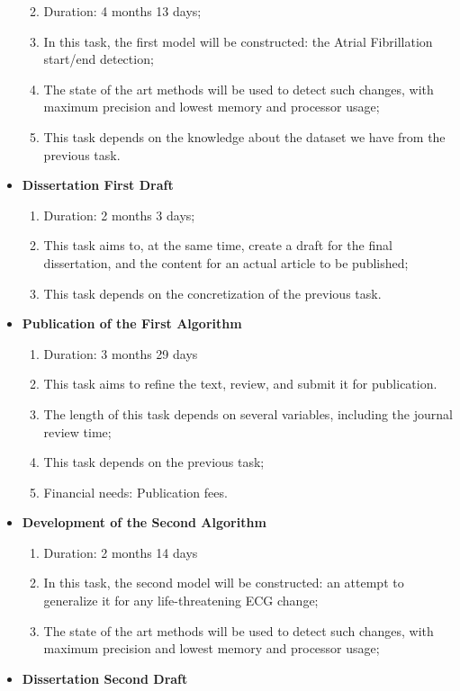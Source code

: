 \documentclass[runningheads]{llncs}
\providecommand{\tightlist}{%
  \setlength{\itemsep}{0pt}\setlength{\parskip}{0pt}}
\begin{document}
\begin{itemize}
  \begin{enumerate}
  \def\labelenumi{\arabic{enumi}.}
  \tightlist
  \item
    Duration: 4 months 13 days;
  \item
    In this task, the first model will be constructed: the Atrial
    Fibrillation start/end detection;
  \item
    The state of the art methods will be used to detect such changes,
    with maximum precision and lowest memory and processor usage;
  \item
    This task depends on the knowledge about the dataset we have from
    the previous task.
  \end{enumerate}
\item
  \textbf{Dissertation First Draft}

  \begin{enumerate}
  \def\labelenumi{\arabic{enumi}.}
  \tightlist
  \item
    Duration: 2 months 3 days;
  \item
    This task aims to, at the same time, create a draft for the final
    dissertation, and the content for an actual article to be published;
  \item
    This task depends on the concretization of the previous task.
  \end{enumerate}
\item
  \textbf{Publication of the First Algorithm}

  \begin{enumerate}
  \def\labelenumi{\arabic{enumi}.}
  \tightlist
  \item
    Duration: 3 months 29 days
  \item
    This task aims to refine the text, review, and submit it for
    publication.
  \item
    The length of this task depends on several variables, including the
    journal review time;
  \item
    This task depends on the previous task;
  \item
    Financial needs: Publication fees.
  \end{enumerate}
\item
  \textbf{Development of the Second Algorithm}

  \begin{enumerate}
  \def\labelenumi{\arabic{enumi}.}
  \tightlist
  \item
    Duration: 2 months 14 days
  \item
    In this task, the second model will be constructed: an attempt to
    generalize it for any life-threatening ECG change;
  \item
    The state of the art methods will be used to detect such changes,
    with maximum precision and lowest memory and processor usage;
  \end{enumerate}
\item
  \textbf{Dissertation Second Draft}


\end{itemize}
\end{document}
